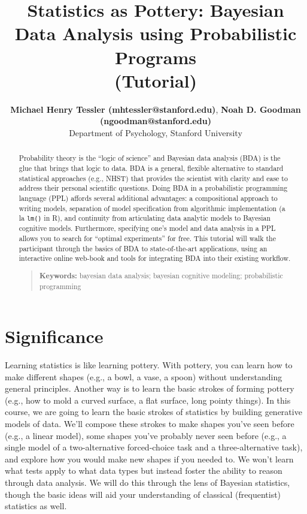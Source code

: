 \documentclass[10pt,letterpaper]{article}
\title{Statistics as Pottery: Bayesian Data Analysis using Probabilistic Programs \\(Tutorial)}
\author{{\large \bf Michael Henry Tessler (mhtessler@stanford.edu)}, {\large \bf Noah D. Goodman (ngoodman@stanford.edu)}  \\
  Department of Psychology, Stanford University
  }
\begin{document}
\maketitle

\begin{abstract}

Probability theory is the ``logic of science'' \cite{jaynes2003probability} and Bayesian data analysis (BDA) is the glue that brings that logic to data.
BDA is a general, flexible alternative to standard statistical approaches (e.g., NHST) that provides the scientist with clarity and ease to address their personal scientific questions. 
Doing BDA in a probabilistic programming language (PPL) affords several additional advantages:  a compositional approach to writing models, separation of model specification from algorithmic implementation (a la \lstinline{lm()} in R), and continuity from articulating data analytic models to Bayesian cognitive models. 
Furthermore, specifying one's model and data analysis in a PPL allows you to search for ``optimal experiments'' for free. 
This tutorial will walk the participant through the basics of BDA to state-of-the-art applications, using an interactive online web-book and tools for integrating BDA into their existing workflow. 
\begin{quote}
\small
\textbf{Keywords:} 
bayesian data analysis; bayesian cognitive modeling; probabilistic programming
\end{quote}

\end{abstract}





\section{Significance}

Learning statistics is like learning pottery. 
With pottery, you can learn how to make different shapes (e.g., a bowl, a vase, a spoon) without understanding general principles. 
Another way is to learn the basic strokes of forming pottery (e.g., how to mold a curved surface, a flat surface, long pointy things). 
In this course, we are going to learn the basic strokes of statistics by building generative models of data. 
We'll compose these strokes to make shapes you've seen before (e.g., a linear model), some shapes you've probably never seen before (e.g., a single model of a two-alternative forced-choice task and a three-alternative task), and explore how you would make new shapes if you needed to. 
We won't learn what tests apply to what data types but instead foster the ability to reason through data analysis. 
We will do this through the lens of Bayesian statistics, though the basic ideas will aid your understanding of classical (frequentist) statistics as well.
\end{document}
